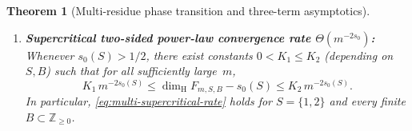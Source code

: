 \documentclass[11pt]{article}
\newtheorem{theorem}{Theorem}
\theoremstyle{definition}
\theoremstyle{remark}
\newcommand{\Z}{\mathbb{Z}}
\newcommand{\dimH}{\dim_{\mathrm{H}}}
\begin{document}
\begin{theorem}[Multi-residue phase transition and three-term asymptotics]
\begin{enumerate}[label=\textup{(\roman*)},leftmargin=2.2em]
\[\]
\[
\lim_{m\to\infty}\frac{\dimH F_{m,S,B}-1/2}{\dimH F_{m,m}-1/2}=d\,C_S.
\]
In particular:
\begin{itemize}[leftmargin=1.5em]
\item for every fixed $r\ge1$,
$\dimH F_{m,r}=\frac12+\frac{C_r}{2m}-\frac{C_r^2\log m}{2m^2}+\frac{C_r(\gamma C_r-C_r')}{2m^2}+O\!\left(\frac{(\log m)^2}{m^3}\right)$,
where $C_r':=\sum_{n=0}^\infty\frac{\log q_n(r)}{q_n(r)}$;
\item for $F_{m,m}$ ($S=\emptyset, B=\{0\}$),
$\dimH F_{m,m}=\frac12+\frac{1}{2m}-\frac{\log m}{2m^2}+\frac{\gamma}{2m^2}+O\!\left(\frac{(\log m)^2}{m^3}\right)$;
\item for $S=\{2,3\}, B=\emptyset$, \eqref{eq:multi-dimH-three-term} holds with $d=2$.
\end{itemize}
\item \textbf{Supercritical two-sided power-law convergence rate $\Theta(m^{-2s_0})$:}
Whenever $s_0(S)>1/2$, there exist constants $0<K_1\le K_2$ (depending on
$S,B$) such that for all sufficiently large~$m$,
\begin{equation}\label{eq:multi-supercritical-rate}
K_1\,m^{-2s_0(S)}\le \dimH F_{m,S,B}-s_0(S)\le K_2\,m^{-2s_0(S)}.
\end{equation}
In particular, \eqref{eq:multi-supercritical-rate} holds for $S=\{1,2\}$ and
every finite $B\subset\Z_{\ge0}$.
\end{enumerate}
\end{theorem}
\end{document}
